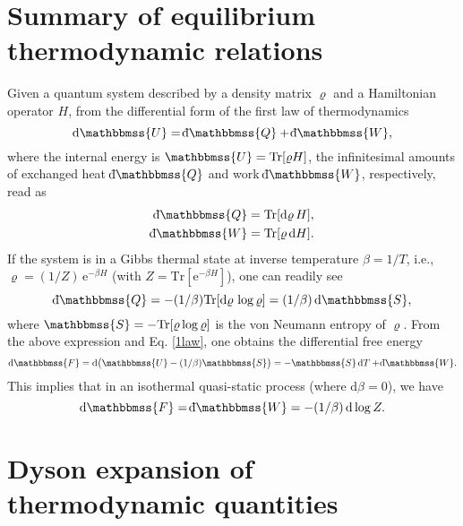 \documentclass[aps,pra,floatfix,twocolumn,groupedaddress,superscriptaddress,nofootinbib,notitlepage,amsmath,amssymb,]{revtex4-1}
\def\dbar{{\mathchar'26\mkern-12mu \mathrm{d}}}
\begin{document}
\begin{widetext}

\section{Summary of equilibrium thermodynamic relations} 
\label{sec:H-EX}

Given a quantum system described by a density matrix $\varrho$ and a Hamiltonian operator $H$, from the differential form of the first law of thermodynamics 
\begin{equation}
\label{1law}
\mathrm{d}\mathbbmss{U}=\dbar \mathbbmss{Q}+\dbar \mathbbmss{W}, 
\end{equation}
where the internal energy is $\mathbbmss{U}=\mathrm{Tr}[\varrho H]$, the infinitesimal amounts of exchanged heat $\dbar \mathbbmss{Q}$ and work $\dbar \mathbbmss{W}$, respectively, read as
\begin{align}
\label{1law1}
\dbar \mathbbmss{Q}&=\mathrm{Tr}[\mathrm{d}\varrho \,H],\\
\dbar \mathbbmss{W}&=\mathrm{Tr}[\varrho\, \mathrm{d}H].
\end{align}
If the system is in a Gibbs thermal state at inverse temperature $\beta=1/T$, i.e., $\varrho=(1/Z)\,\mathrm{e}^{-\beta H}$ (with $Z=\mathrm{Tr}[\mathrm{e}^{-\beta H}]$), one can readily see
\begin{equation}
\label{1law2}
\dbar \mathbbmss{Q}=-(1/\beta)\mathrm{Tr}[\mathrm{d}\varrho\, \log\varrho] = (1/\beta)\, \mathrm{d}\mathbbmss{S},
\end{equation}
where $\mathbbmss{S}=-\mathrm{Tr}[\varrho\log\varrho]$ is the von Neumann entropy of $\varrho$. From the above expression and Eq. \eqref{1law}, one obtains the differential free energy 
\begin{equation}
\label{1law3}
\mathrm{d}\mathbbmss{F}=\mathrm{d}\big(\mathbbmss{U}-(1/\beta) \mathbbmss{S}\big)=-\mathbbmss{S}\,\mathrm{d}T+\dbar \mathbbmss{W}.
\end{equation}
This implies that in an isothermal quasi-static process (where $\mathrm{d}\beta=0$), we have
\begin{equation}
\label{1law4}
\mathrm{d} \mathbbmss{F} =\dbar \mathbbmss{W}=-(1/\beta)\,\mathrm{d}\log Z.
\end{equation}

\section{Dyson expansion of thermodynamic quantities}
\label{sec:QHE}


\end{widetext}
\end{document}
